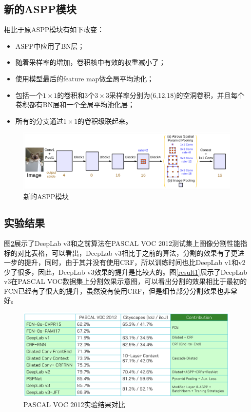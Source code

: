 \documentclass[cn]{elegantbook}
\begin{document}
\subsection{新的ASPP模块}
相比于原ASPP模块有如下改变：
\begin{itemize}
	\item ASPP中应用了BN层；
	\item 随着采样率的增加，卷积核中有效的权重减小了；
	\item 使用模型最后的feature map做全局平均池化；
	\item 包括一个$1\times 1$的卷积和3个$3\times 3$采样率分别为(6,12,18)的空洞卷积，并且每个卷积都有BN层和一个全局平均池化层；
	\item 所有的分支通过$1\times 1$的卷积级联起来。
\end{itemize}

\begin{figure}[h]
	\centering
	\includegraphics[width=\textwidth]{images/asppnew.png}
	\caption{\label{asppnew}新的ASPP模块}
\end{figure}

\subsection{实验结果}
图\ref{result0}展示了DeepLab v3和之前算法在PASCAL VOC 2012测试集上图像分割性能指标的对比表格，可以看出，DeepLab v3相比于之前的算法，分割的效果有了更进一步的提升，同时，由于其并没有使用CRF，所以训练时间也比DeepLab v1和v2少了很多，因此，DeepLab v3效果的提升是比较大的。图\ref{result1}展示了DeepLab v3在PASCAL VOC数据集上分割效果示意图，可以看出分割的效果相比于最初的FCN已经有了很大的提升，虽然没有使用CRF，但是细节部分分割效果也非常好。
\begin{figure}[h]
	\centering
	\includegraphics[width=\textwidth]{images/result0.png}
	\caption{\label{result0}PASCAL VOC 2012实验结果对比}
\end{figure}
\end{document}
